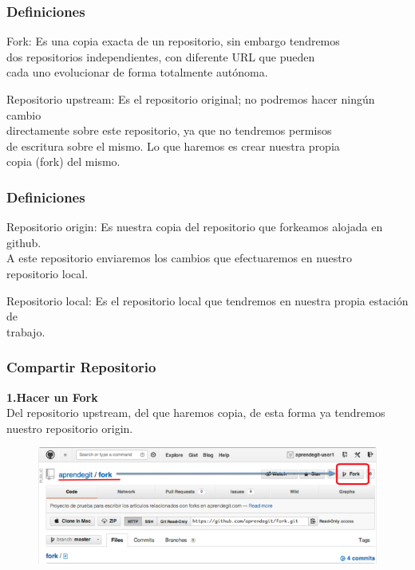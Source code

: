 \begin{frame}[fragile]
    \frametitle{Definiciones}
    \begin{alertblock}{Fork:}
        Es una copia exacta de un repositorio, sin embargo tendremos\\
        dos repositorios independientes, con diferente URL que pueden\\
        cada uno evolucionar de forma totalmente aut\'onoma. \\
    \end{alertblock}

    \begin{alertblock}{Repositorio upstream:}
        Es el repositorio original; no podremos hacer ning\'un cambio\\
        directamente sobre este repositorio, ya que no tendremos permisos\\
        de escritura sobre el mismo. Lo que haremos es crear nuestra propia\\
        copia (fork) del mismo.
    \end{alertblock}
\end{frame}

\begin{frame}[fragile]
    \frametitle{Definiciones}
    \begin{alertblock}{Repositorio origin:}
        Es nuestra copia del repositorio que forkeamos alojada en github.\\
        A este repositorio enviaremos los cambios que efectuaremos en nuestro
        \\repositorio local.
    \end{alertblock}

    \begin{alertblock}{Repositorio local:}
        Es el repositorio local que tendremos en nuestra propia estaci\'on 
        de\\trabajo.
    \end{alertblock}
\end{frame}

\begin{frame}[fragile]
    \frametitle{Compartir Repositorio}
    \textbf{1.Hacer un Fork}\\
        Del repositorio upstream, del que haremos copia, de esta forma ya 
        tendremos nuestro repositorio origin.
        \begin{figure}[t]
            \raggedleft
            \includegraphics[width=1\textwidth]{Images/6.png}
        \end{figure}
\end{frame}

